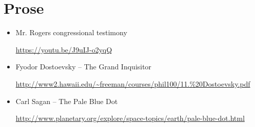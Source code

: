 \documentclass[12pt, openany, letterpaper]{memoir}
\begin{document}
\chapter{Prose}
\begin{itemize}
	\item Mr. Rogers congressional testimony
	
	\hyperref[https://youtu.be/J9uIJ-o2yqQ]{https://youtu.be/J9uIJ-o2yqQ}
	
	\item Fyodor Dostoevsky -- The Grand Inquisitor
	
	\url{http://www2.hawaii.edu/~freeman/courses/phil100/11.\%20Dostoevsky.pdf}
	
	\item Carl Sagan -- The Pale Blue Dot
	
	\hyperref[http://www.planetary.org/explore/space-topics/earth/pale-blue-dot.html]{http://www.planetary.org/explore/space-topics/earth/pale-blue-dot.html}
\end{itemize}
\end{document}
